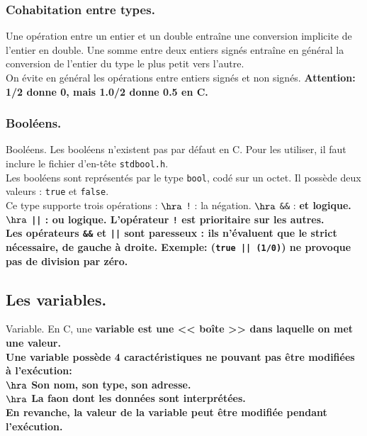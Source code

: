 \documentclass[french, 11pt]{article}
\begin{document}
\subsubsection{Cohabitation entre types.}

\begin{defi}{}{}
    Une opération entre un entier et un double entraîne une conversion implicite de l'entier en double. Une somme entre deux entiers signés entraîne en général la conversion de l'entier du type le plus petit vers l'autre.\\
    On évite en général les opérations entre entiers signés et non signés.\n
    \bf{Attention:} 1/2 donne 0, mais 1.0/2 donne 0.5 en C.
\end{defi}

\subsubsection{Booléens.}
\begin{defi}{Booléens.}{}
    Les booléens n'existent pas par défaut en C. Pour les utiliser, il faut inclure le fichier d'en-tête \texttt{stdbool.h}.\\
    Les booléens sont représentés par le type \texttt{bool}, codé sur un octet. Il possède deux valeurs : \texttt{true} et \texttt{false}.\\
    Ce type supporte trois opérations :
    $\hra$ \texttt{!} : la négation.
    $\hra$ \texttt{\&\&} : \bf{et} logique.
    $\hra$ \texttt{||} : \bf{ou} logique.
    L'opérateur \texttt{!} est prioritaire sur les autres.\\
    Les opérateurs \texttt{\&\&} et \texttt{||} sont paresseux : ils n'évaluent que le strict nécessaire, de gauche à droite.\n
    \bf{Exemple:} (\texttt{true || (1/0)}) ne provoque pas de division par zéro.
\end{defi}

\subsection{Les variables.}

\begin{defi}{Variable.}{}
    En C, une \bf{variable} est une << boîte >> dans laquelle on met une valeur.\\
    Une variable possède 4 caractéristiques ne pouvant pas être modifiées à l'exécution:\\
    $\hra$ Son nom, son type, son adresse.\\
    $\hra$ La faon dont les données sont interprétées.\\
    En revanche, la valeur de la variable peut être modifiée pendant l'exécution.
\end{defi}
\end{document}
